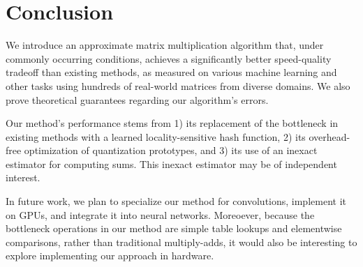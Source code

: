 \documentclass{article}  %
\begin{document}


\section{Conclusion}

We introduce an approximate matrix multiplication algorithm that, under commonly occurring conditions, achieves a significantly better speed-quality tradeoff than existing methods, as measured on various machine learning and other tasks using hundreds of real-world matrices from diverse domains. We also prove theoretical guarantees regarding our algorithm's errors.

Our method's performance stems from 1) its replacement of the bottleneck in existing methods with a learned locality-sensitive hash function, 2) its overhead-free optimization of quantization prototypes, and 3) its use of an inexact estimator for computing sums. This inexact estimator may be of independent interest.

In future work, we plan to specialize our method for convolutions, implement it on GPUs, and integrate it into neural networks. Moreoever, because the bottleneck operations in our method are simple table lookups and elementwise comparisons, rather than traditional multiply-adds, it would also be interesting to explore implementing our approach in hardware.





% 
% 
% 
% 

% 




\clearpage
\newpage  %
\appendix

\end{document}
